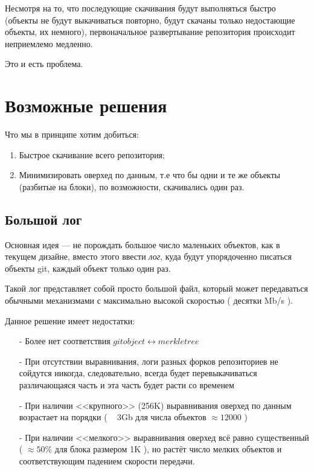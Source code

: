 \documentclass[11pt,a4paper]{article}
\begin{document}
Несмотря на то, что последующие скачивания будут выполняться быстро (объекты не
будут выкачиваться повторно, будут скачаны только недостающие объекты, их
немного), первоначальное развертывание репозитория происходит неприемлемо
медленно.

Это и есть проблема.

\section{Возможные решения}

Что мы в принципе хотим добиться:

\begin{enumerate}
  \item Быстрое скачивание всего репозитория;
  \item Минимизировать оверхед по данным, т.е что бы одни и те же объекты
    (разбитые на блоки), по возможности, скачивались один раз.
\end{enumerate}

\subsection{Большой лог}

Основная идея --- не порождать большое число маленьких объектов, как в текущем
дизайне, вместо этого ввести \textit{лог}, куда будут упорядоченно
писаться объекты git, каждый объект только один раз.

Такой лог представляет собой просто большой файл, который может передаваться
обычными механизмами с максимально высокой скоростью ( десятки Mb/s ).

Данное решение имеет недостатки:

\begin{itemize}
  \item[-] Более нет соответствия $ git object \leftrightarrow  merkle tree $

  \item[-] При отсутствии выравнивания, логи разных форков репозиториев
           не сойдутся никогда, следовательно, всегда будет перевыкачиваться
           различающаяся часть и эта часть будет расти со временем

  \item[-] При наличии <<крупного>> (256K) выравнивания оверхед по данным возрастает
           на порядки ( ~ 3Gb для числа объектов $ \approx 12000$ )

  \item[-] При наличии <<мелкого>> выравнивания оверхед всё равно
           существенный ( $ \approx 50\% $ для блока размером 1K ),
           но растёт число мелких объектов и соответствующим падением скорости
           передачи.
\end{itemize}
\end{document}
